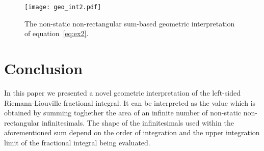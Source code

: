 \documentclass[twoside,reqno,11pt]{fcaa-var} %
\begin{document}
\begin{figure}[htb]
\centering
\texttt{[image: geo\_int2.pdf]}
\caption{The non-static non-rectangular sum-based geometric interpretation of equation~\eqref{eq:ex2}.}
\label{fig:geo2}
\end{figure}

\section{Conclusion}
\noindent
In this paper we presented a novel geometric interpretation of the left-sided 
Riemann-Liouville fractional integral. It can be interpreted as the value which is 
obtained by summing toghether the area of an infinite number of non-static non-rectangular infinitesimals. The shape of the infinitesimals used within the aforementioned sum depend on the order of integration and the upper integration limit of the fractional integral being evaluated.





\end{document}
